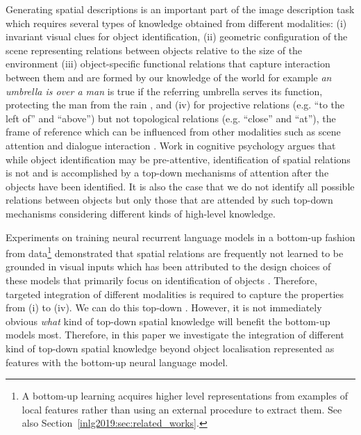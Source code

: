 Generating spatial descriptions is an important part of the image
description task which requires
several types of knowledge obtained from different modalities: %
 (i) invariant visual clues for object identification,
 (ii) geometric configuration of the scene representing relations between objects relative to the size of the environment %
 (iii) object-specific functional relations that capture interaction between them and are formed by our knowledge of the world %
 for example \emph{an umbrella is over a man} is true if the referring
umbrella serves its function, protecting the man from the rain \cite{coventry2001interplay}, and
 (iv) for projective relations (e.g. ``to the left of'' and ``above'') but not topological relations (e.g. ``close'' and ``at''), the frame of reference which can be influenced from other modalities such as scene attention and dialogue interaction %
 \cite{Dobnik:2015aa}.
 Work in cognitive psychology \cite{logan1994spatial,logan1995linguistic} argues that while object identification may be pre-attentive, identification of spatial relations is not and is accomplished by a top-down mechanisms of attention after the objects have been identified. It is also the case that we do not identify all possible relations between objects but only those that are attended by such top-down mechanisms considering different kinds of high-level knowledge.

Experiments on training neural recurrent %
language models in a bottom-up fashion from data\footnote{
  A bottom-up learning acquires higher level representations from examples of local features rather than using an external procedure to extract them. %
  See also Section~\ref{inlg2019:sec:related_works}.
}
demonstrated that spatial relations are frequently not learned to be grounded in visual inputs
\cite{lu2017knowing,tanti2018quantifying,ghanimifard2018knowing}
which has been attributed
to the design choices of these models that primarily focus on
identification of objects \cite{kelleher2017what}.
Therefore, targeted integration of different modalities is required to
capture the properties from (i) to (iv).  
We can do this top-down	%
\cite{anderson2018bottom,hu2017modeling,liu2017attention}.  
However,
it is not immediately obvious \emph{what} kind of top-down spatial
knowledge will benefit the bottom-up models most. Therefore, in this
paper we investigate the integration of different kind of top-down
spatial knowledge beyond object localisation represented as features with the bottom-up neural
language model.


















